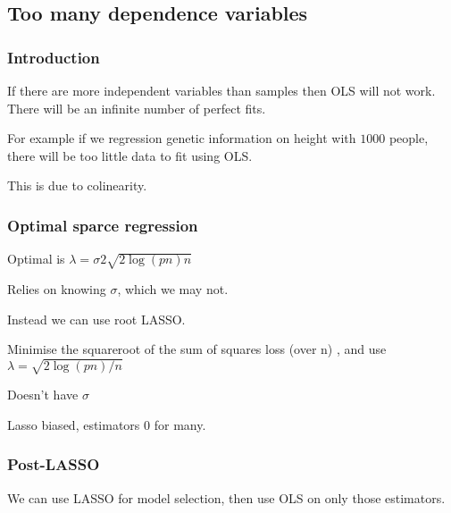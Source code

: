 
\subsection{Too many dependence variables}

\subsubsection{Introduction}

If there are more independent variables than samples then OLS will not work. There will be an infinite number of perfect fits.

For example if we regression genetic information on height with \(1000\) people, there will be too little data to fit using OLS.

This is due to colinearity.

\subsubsection{Optimal sparce regression}

Optimal is \(\lambda = \sigma 2\sqrt {{2\log (pn)}{n}}\)

Relies on knowing \(\sigma \), which we may not.

Instead we can use root LASSO.

Minimise the squareroot of the sum of squares loss (over n) , and use \(\lambda = \sqrt{2\log (pn)/n}\)

Doesn't have \(\sigma \)

Lasso biased, estimators \(0\) for many.

\subsubsection{Post-LASSO}

We can use LASSO for model selection, then use OLS on only those estimators.

